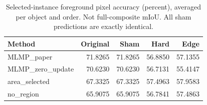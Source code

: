 \begin{table}[htbp]
\centering\scriptsize
\caption{Selected-instance foreground pixel accuracy (percent), averaged per object and order. Not full-composite mIoU. All sham predictions are exactly identical.}
\label{tab:context}
\setlength{\tabcolsep}{4pt}
\begin{tabular}{lrrrr}
\toprule
Method & Original & Sham & Hard & Edge \\
\midrule
MLMP\_paper & 71.8265 & 71.8265 & 56.8850 & 57.1355 \\
MLMP\_zero\_update & 70.6230 & 70.6230 & 56.7131 & 55.4147 \\
area\_selected & 67.3325 & 67.3325 & 57.4963 & 57.9583 \\
no\_region & 65.9075 & 65.9075 & 56.7841 & 57.4863 \\
\bottomrule
\end{tabular}
\end{table}
